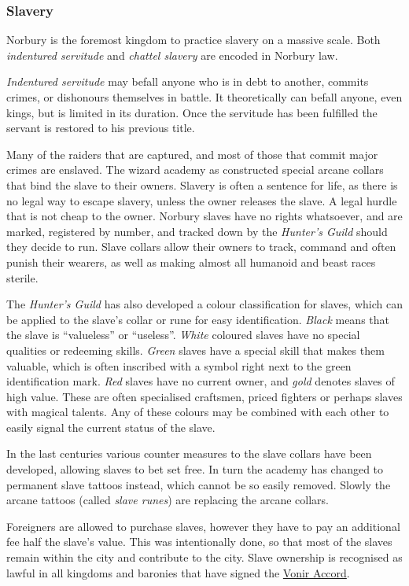 \subsubsection*{Slavery}

Norbury is the foremost kingdom to practice slavery on a massive scale. Both
\emph{indentured servitude} and \emph{chattel slavery} are encoded in Norbury
law.

\emph{Indentured servitude} may befall anyone who is in debt to another,
commits crimes, or dishonours themselves in battle. It theoretically can
befall anyone, even kings, but is limited in its duration. Once the servitude
has been fulfilled the servant is restored to his previous title.

Many of the raiders that are captured, and most of those that commit major
crimes are enslaved. The wizard academy as constructed special arcane collars
that bind the slave to their owners. Slavery is often a sentence for life, as
there is no legal way to escape slavery, unless the owner releases the slave.
A legal hurdle that is not cheap to the owner. Norbury slaves have no rights
whatsoever, and are marked, registered by number, and tracked down by the
\emph{Hunter's Guild} should they decide to run. Slave collars allow their
owners to track, command and often punish their wearers, as well as making
almost all humanoid and beast races sterile.

The \emph{Hunter's Guild} has also developed a colour classification for
slaves, which can be applied to the slave's collar or rune for easy
identification.  \emph{Black} means that the slave is ``valueless'' or
``useless''. \emph{White} coloured slaves have no special qualities or
redeeming skills. \emph{Green} slaves have a special skill that makes them
valuable, which is often inscribed with a symbol right next to the green
identification mark. \emph{Red} slaves have no current owner, and \emph{gold}
denotes slaves of high value. These are often specialised craftsmen, priced
fighters or perhaps slaves with magical talents. Any of these colours may be
combined with each other to easily signal the current status of the slave.

In the last centuries various counter measures to the slave collars have been
developed, allowing slaves to bet set free. In turn the academy has changed to
permanent slave tattoos instead, which cannot be so easily removed. Slowly the
arcane tattoos (called \emph{slave runes}) are replacing the arcane collars.

Foreigners are allowed to purchase slaves, however they have to pay an
additional fee half the slave's value. This was intentionally done, so that
most of the slaves remain within the city and contribute to the city. Slave
ownership is recognised as lawful in all kingdoms and baronies that have
signed the \hyperref[sec:Vonir Accord]{Vonir Accord}.

